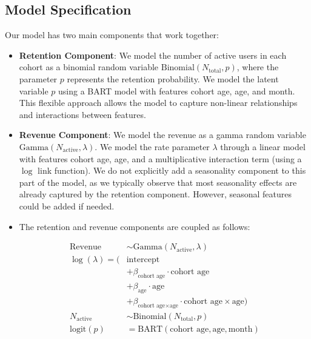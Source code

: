 \documentclass[11pt]{amsart}
\theoremstyle{definition}
\begin{document}
\subsection*{Model Specification}
Our model has two main components that work together:
\begin{itemize}
    \item {\bf Retention Component}: We model the number of active users in each cohort as a binomial random
          variable $\text{Binomial}(N_{\text{total}}, p)$, where the parameter $p$ represents the retention probability.
          We model the latent variable $p$ using a BART model with features cohort age, age, and month. This flexible
          approach allows the model to capture non-linear relationships and interactions between features.

    \item {\bf Revenue Component}: We model the revenue as a gamma random variable $\text{Gamma}(N_{\text{active}}, \lambda)$.
          We model the rate parameter $\lambda$ through a linear model with features cohort age, age, and a multiplicative
          interaction term (using a $\log$ link function). We do not explicitly add a seasonality component to this part of
          the model, as we typically observe that most seasonality effects are already captured by the retention component.
          However, seasonal features could be added if needed.

    \item The retention and revenue components are coupled as follows:

          \begin{align*}
              \text{Revenue}    & \sim \text{Gamma}(N_{\text{active}}, \lambda)                                            \\
              \log(\lambda) = ( & \text{intercept}                                                                         \\
                                & + \beta_{\text{cohort age}} \cdot \text{cohort age}                                      \\
                                & + \beta_{\text{age}} \cdot \text{age}                                                    \\
                                & + \beta_{\text{cohort age} \times \text{age}} \cdot \text{cohort age} \times \text{age}) \\
              N_{\text{active}} & \sim \text{Binomial}(N_{\text{total}}, p)                                                \\
              \textrm{logit}(p) & = \text{BART}(\text{cohort age}, \text{age}, \text{month})
          \end{align*}

\end{itemize}
\end{document}
